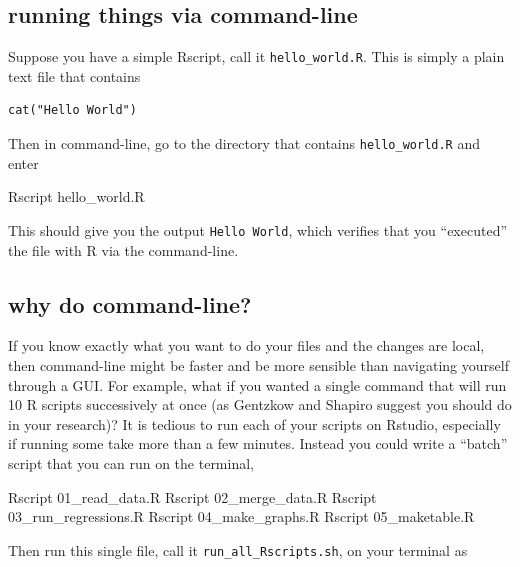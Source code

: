 \documentclass[]{book}
\newenvironment{Shaded}{\begin{snugshade}}{\end{snugshade}}
\newcommand{\ExtensionTok}[1]{#1}
\newcommand{\NormalTok}[1]{#1}
\theoremstyle{definition}
\theoremstyle{definition}
\theoremstyle{definition}
\theoremstyle{remark}
\begin{document}
\subsection{running things via
command-line}\label{running-things-via-command-line}

Suppose you have a simple Rscript, call it \texttt{hello\_world.R}. This
is simply a plain text file that contains

\begin{verbatim}
cat("Hello World")
\end{verbatim}

Then in command-line, go to the directory that contains
\texttt{hello\_world.R} and enter

\begin{Shaded}
\begin{Highlighting}[]
\ExtensionTok{Rscript}\NormalTok{ hello_world.R}
\end{Highlighting}
\end{Shaded}

This should give you the output \texttt{Hello\ World}, which verifies
that you ``executed'' the file with R via the command-line.

\subsection{why do command-line?}\label{why-do-command-line}

If you know exactly what you want to do your files and the changes are
local, then command-line might be faster and be more sensible than
navigating yourself through a GUI. For example, what if you wanted a
single command that will run 10 R scripts successively at once (as
Gentzkow and Shapiro suggest you should do in your research)? It is
tedious to run each of your scripts on Rstudio, especially if running
some take more than a few minutes. Instead you could write a ``batch''
script that you can run on the terminal,

\begin{Shaded}
\begin{Highlighting}[]
\ExtensionTok{Rscript}\NormalTok{ 01_read_data.R}
\ExtensionTok{Rscript}\NormalTok{ 02_merge_data.R}
\ExtensionTok{Rscript}\NormalTok{ 03_run_regressions.R}
\ExtensionTok{Rscript}\NormalTok{ 04_make_graphs.R}
\ExtensionTok{Rscript}\NormalTok{ 05_maketable.R}
\end{Highlighting}
\end{Shaded}

Then run this single file, call it \texttt{run\_all\_Rscripts.sh}, on
your terminal as
\end{document}
